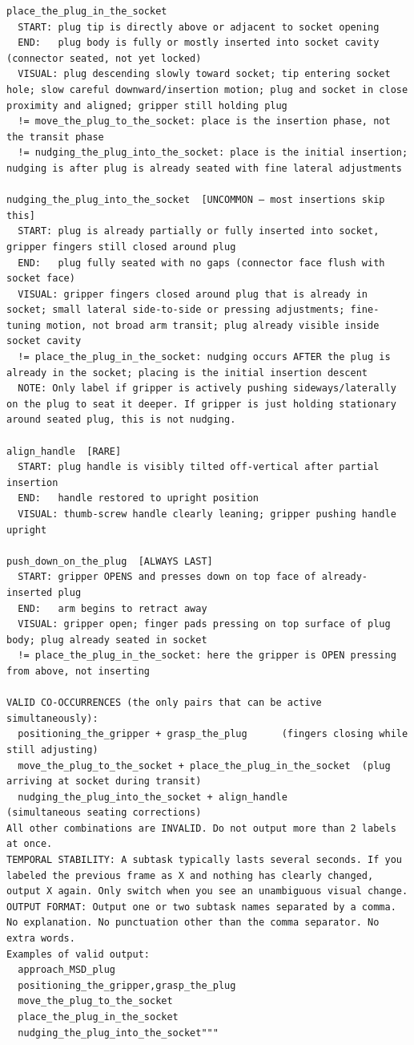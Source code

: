 \documentclass[conference]{IEEEtran}
\begin{document}
\begin{lstlisting}[caption={MSD Plug Insertion Labeling Prompt used for Qwen3}, label={lst:Qwen_msd_prompt}]
place_the_plug_in_the_socket
  START: plug tip is directly above or adjacent to socket opening
  END:   plug body is fully or mostly inserted into socket cavity (connector seated, not yet locked)
  VISUAL: plug descending slowly toward socket; tip entering socket hole; slow careful downward/insertion motion; plug and socket in close proximity and aligned; gripper still holding plug
  != move_the_plug_to_the_socket: place is the insertion phase, not the transit phase
  != nudging_the_plug_into_the_socket: place is the initial insertion; nudging is after plug is already seated with fine lateral adjustments

nudging_the_plug_into_the_socket  [UNCOMMON — most insertions skip this]
  START: plug is already partially or fully inserted into socket, gripper fingers still closed around plug
  END:   plug fully seated with no gaps (connector face flush with socket face)
  VISUAL: gripper fingers closed around plug that is already in socket; small lateral side-to-side or pressing adjustments; fine-tuning motion, not broad arm transit; plug already visible inside socket cavity
  != place_the_plug_in_the_socket: nudging occurs AFTER the plug is already in the socket; placing is the initial insertion descent
  NOTE: Only label if gripper is actively pushing sideways/laterally on the plug to seat it deeper. If gripper is just holding stationary around seated plug, this is not nudging.

align_handle  [RARE]
  START: plug handle is visibly tilted off-vertical after partial insertion
  END:   handle restored to upright position
  VISUAL: thumb-screw handle clearly leaning; gripper pushing handle upright

push_down_on_the_plug  [ALWAYS LAST]
  START: gripper OPENS and presses down on top face of already-inserted plug
  END:   arm begins to retract away
  VISUAL: gripper open; finger pads pressing on top surface of plug body; plug already seated in socket
  != place_the_plug_in_the_socket: here the gripper is OPEN pressing from above, not inserting

VALID CO-OCCURRENCES (the only pairs that can be active simultaneously):
  positioning_the_gripper + grasp_the_plug      (fingers closing while still adjusting)
  move_the_plug_to_the_socket + place_the_plug_in_the_socket  (plug arriving at socket during transit)
  nudging_the_plug_into_the_socket + align_handle              (simultaneous seating corrections)
All other combinations are INVALID. Do not output more than 2 labels at once.
TEMPORAL STABILITY: A subtask typically lasts several seconds. If you labeled the previous frame as X and nothing has clearly changed, output X again. Only switch when you see an unambiguous visual change.
OUTPUT FORMAT: Output one or two subtask names separated by a comma. No explanation. No punctuation other than the comma separator. No extra words.
Examples of valid output:
  approach_MSD_plug
  positioning_the_gripper,grasp_the_plug
  move_the_plug_to_the_socket
  place_the_plug_in_the_socket
  nudging_the_plug_into_the_socket"""
\end{lstlisting}
\end{document}
